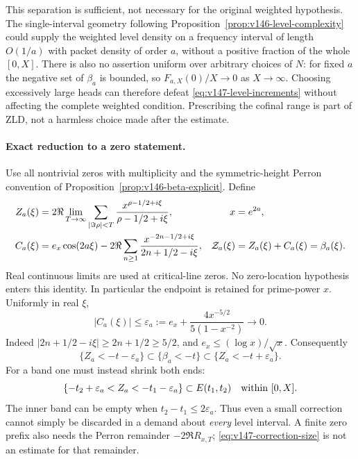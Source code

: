 \documentclass[11pt]{article}
\theoremstyle{remark}
\begin{document}
This separation is sufficient, not necessary for the original weighted
hypothesis. The single-interval geometry following
Proposition~\ref{prop:v146-level-complexity} could supply the weighted
level density on a frequency interval of length $O(1/a)$ with packet
density of order $a$, without a positive fraction of the whole $[0,X]$.
There is also no assertion uniform over arbitrary choices of $N$:
for fixed $a$ the negative set of $\beta_a$ is bounded, so
$F_{a,X}(0)/X\to0$ as $X\to\infty$. Choosing excessively large
heads can therefore defeat \eqref{eq:v147-level-increments} without
affecting the complete weighted condition. Prescribing the cofinal
range is part of ZLD, not a harmless choice made after the estimate.

\paragraph{Exact reduction to a zero statement.}
Use all nontrivial zeros with multiplicity and the symmetric-height
Perron convention of Proposition~\ref{prop:v146-beta-explicit}. Define
\begin{align}
 Z_a(\xi)&=2\Re\lim_{T\to\infty}
       \sum_{|\Im\rho|<T}\frac{x^{\rho-1/2+i\xi}}{\rho-1/2+i\xi},
 &x&=e^{2a}, \notag\\
 C_a(\xi)&=e_x\cos(2a\xi)
       -2\Re\sum_{n\ge1}\frac{x^{-2n-1/2+i\xi}}{2n+1/2-i\xi},
 &\mathcal Z_a(\xi)&=Z_a(\xi)+C_a(\xi)=\beta_a(\xi).
 \label{eq:v147-corrected-zero-field}
\end{align}
Real continuous limits are used at critical-line zeros. No zero-location
hypothesis enters this identity. In particular the endpoint is retained
for prime-power $x$. Uniformly in real $\xi$,
\begin{equation}\label{eq:v147-correction-size}
 |C_a(\xi)|\le\varepsilon_a:=
 e_x+\frac{4x^{-5/2}}{5(1-x^{-2})}\longrightarrow0.
\end{equation}
Indeed $|2n+1/2-i\xi|\ge2n+1/2\ge5/2$, and
$e_x\le(\log x)/\sqrt x$. Consequently
\[
 \{Z_a<-t-\varepsilon_a\}\subset\{\beta_a<-t\}
 \subset\{Z_a<-t+\varepsilon_a\}.
\]
For a band one must instead shrink both ends:
\[
 \{-t_2+\varepsilon_a<Z_a<-t_1-\varepsilon_a\}
 \subset E(t_1,t_2)
 \quad\hbox{within }[0,X].
\]
The inner band can be empty when $t_2-t_1\le2\varepsilon_a$.
Thus even a small correction cannot simply be discarded in a demand
about \emph{every} level interval. A finite zero prefix also needs the
Perron remainder $-2\Re R_{x,T}$; \eqref{eq:v147-correction-size} is
not an estimate for that remainder.
\end{document}
